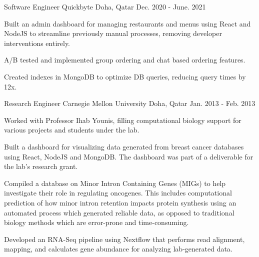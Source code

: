 \begin{cventries}
  \cventry
    {Software Engineer} %
    {Quickbyte} %
    {Doha, Qatar} %
    {Dec. 2020 - June. 2021} %
    {
      \begin{cvitems} %
        \item {Built an admin dashboard for managing restaurants and menus using React and NodeJS to streamline previously manual processes, removing developer interventions entirely.}
        \item {A/B tested and implemented group ordering and chat based ordering features.}
        \item {Created indexes in MongoDB to optimize DB queries, reducing query times by 12x.}
      \end{cvitems}
    }

  \cventry
    {Research Engineer} %
    {Carnegie Mellon University} %
    {Doha, Qatar} %
    {Jan. 2013 - Feb. 2013} %
    {
      \begin{cvitems} %
        \item {Worked with Professor Ihab Younis, filling computational biology support for various projects and students under the lab.}
        \item {Built a dashboard for visualizing data generated from breast cancer databases using React, NodeJS and MongoDB. The
        dashboard was part of a deliverable for the lab’s research grant.}
        \item {Compiled a database on Minor Intron Containing Genes (MIGs) to help investigate their role in regulating oncogenes. This
        includes computational prediction of how minor intron retention impacts protein synthesis using an automated process
        which generated reliable data, as opposed to traditional biology methods which are error-prone and time-consuming.}
        \item {Developed an RNA-Seq pipeline using Nextflow that performs read alignment, mapping, and calculates gene abundance for
        analyzing lab-generated data.}
      \end{cvitems}
    }

\end{cventries}
